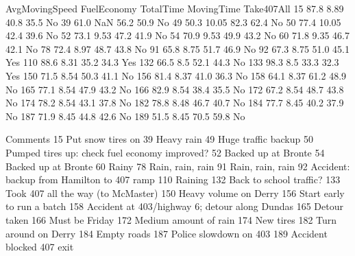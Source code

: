 \documentclass[letterpaper,10pt,english]{jupyterBook}
\begin{document}
\begin{sphinxVerbatim}[commandchars=\\\{\}]
     AvgMovingSpeed FuelEconomy  TotalTime  MovingTime Take407All  \PYGZbs{}
15             87.8        8.89       40.8        35.5         No   
39             61.0         NaN       56.2        50.9         No   
49             50.3       10.05       82.3        62.4         No   
50             77.4       10.05       42.4        39.6         No   
52             73.1        9.53       47.2        41.9         No   
54             70.9        9.53       49.9        43.2         No   
60             71.8        9.35       46.7        42.1         No   
78             72.4        8.97       48.7        43.8         No   
91             65.8        8.75       51.7        46.9         No   
92             67.3        8.75       51.0        45.1        Yes   
110            88.6        8.31       35.2        34.3        Yes   
132            66.5         8.5       52.1        44.3         No   
133            98.3         8.5       33.3        32.3        Yes   
150            71.5        8.54       50.3        41.1         No   
156            81.4        8.37       41.0        36.3         No   
158            64.1        8.37       61.2        48.9         No   
165            77.1        8.54       47.9        43.2         No   
166            82.9        8.54       38.4        35.5         No   
172            67.2        8.54       48.7        43.8         No   
174            78.2        8.54       43.1        37.8         No   
182            78.8        8.48       46.7        40.7         No   
184            77.7        8.45       40.2        37.9         No   
187            71.9        8.45       44.8        42.6         No   
189            51.5        8.45       70.5        59.8         No   

                                           Comments  
15                                Put snow tires on  
39                                       Heavy rain  
49                              Huge traffic backup  
50    Pumped tires up: check fuel economy improved?  
52                              Backed up at Bronte  
54                              Backed up at Bronte  
60                                            Rainy  
78                                 Rain, rain, rain  
91                                 Rain, rain, rain  
92       Accident: backup from Hamilton to 407 ramp  
110                                         Raining  
132                         Back to school traffic?  
133              Took 407 all the way (to McMaster)  
150                           Heavy volume on Derry  
156                      Start early to run a batch  
158  Accident at 403/highway 6; detour along Dundas  
165                                    Detour taken  
166                                  Must be Friday  
172                           Medium amount of rain  
174                                       New tires  
182                            Turn around on Derry  
184                                     Empty roads  
187                          Police slowdown on 403  
189                       Accident blocked 407 exit  
\end{sphinxVerbatim}
\end{document}
